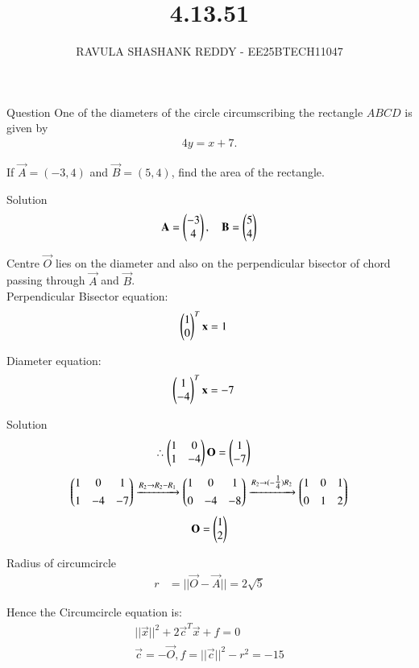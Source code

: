\documentclass{beamer}
\title %
{4.13.51}
\author %
{RAVULA SHASHANK REDDY - EE25BTECH11047}
\begin{document}
	
	
	\frame{\titlepage}
	\begin{frame}{Question}
One of the diameters of the circle circumscribing the rectangle \(ABCD\) is given by
\begin{align*}
4y = x + 7.
\end{align*}

If \(\vec{A}=(-3,4)\) and \(\vec{B}=(5,4)\), find the area of the rectangle.

\end{frame}
\begin{frame}{Solution}
    \begin{align}
\mathbf{A}=\begin{pmatrix}-3\\4\end{pmatrix},\quad \mathbf{B}=\begin{pmatrix}5\\4\end{pmatrix}
\end{align}

Centre \(\vec{O}\) lies on the diameter and also on the perpendicular bisector of chord passing  
through \(\vec{A}\) and \(\vec{B}\).\\

Perpendicular Bisector equation:
\begin{align}
\begin{pmatrix}1 \\ 0\end{pmatrix}^T\mathbf{x}&=1
\end{align}

Diameter equation:
\begin{align}
\begin{pmatrix}1 \\ -4\end{pmatrix}^T\mathbf{x}&=-7
\end{align}
\end{frame}
\begin{frame}{Solution}
\begin{align}
\therefore
\begin{pmatrix}1 & 0\\ 1 & -4\end{pmatrix}\mathbf{O} &= \begin{pmatrix}1\\-7\end{pmatrix}
\end{align}
\begin{align}
\begin{pmatrix}1 & 0 & 1\\[4pt] 1 & -4 & -7\end{pmatrix}
\xrightarrow{R_2\rightarrow R_2-R_1}
\begin{pmatrix}1 & 0 & 1\\[4pt] 0 & -4 & -8\end{pmatrix}
\xrightarrow{R_2\rightarrow (-\tfrac{1}{4})R_2}
\begin{pmatrix}1 & 0 & 1\\[4pt] 0 & 1 & 2\end{pmatrix}
\end{align}
\begin{align}
    \mathbf{O}=\begin{pmatrix}1\\2\end{pmatrix}
\end{align}

Radius of circumcircle
\begin{align}
r&=||\vec{O}-\vec{A}||=2\sqrt{5}
\end{align}

Hence the Circumcircle equation is:
\begin{align}
||\vec{x}||^2+2\vec{c}^T\vec{x}+f=0\\
\vec{c}=-\vec{O},
f=||\vec{c}||^2-r^2=-15
\end{align}
\end{frame}
\end{document}
